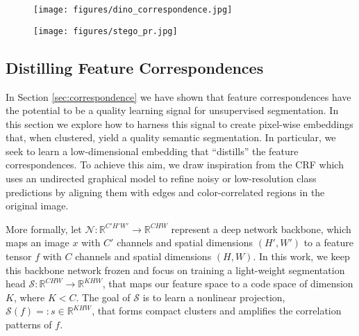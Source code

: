 \documentclass{article} \usepackage{iclr2022_conference,times}
\begin{document}
\begin{figure}[t]
\centering
\begin{minipage}{.60\textwidth}
  \centering
    \texttt{[image: figures/dino\_correspondence.jpg]}
    \vspace{-.2in}
  \label{fig:correspondence}
\end{minipage}\hfill
\begin{minipage}{.38\textwidth}
  \centering
  \texttt{[image: figures/stego\_pr.jpg]}
  \vspace{-.1in}
  \label{fig:pr}
\end{minipage}
\end{figure} 

\subsection{Distilling Feature Correspondences}
\label{sec:distillation} 

In Section \ref{sec:correspondence} we have shown that feature correspondences have the potential to be a quality learning signal for unsupervised segmentation. In this section we explore how to harness this signal to create pixel-wise embeddings that, when clustered, yield a quality semantic segmentation. In particular, we seek to learn a low-dimensional embedding that ``distills'' the feature correspondences. To achieve this aim, we draw inspiration from the CRF which uses an undirected graphical model to refine noisy or low-resolution class predictions by aligning them with edges and color-correlated regions in the original image. 

More formally, let $\mathcal{N}: \mathbb{R}^{C'H'W'} \to \mathbb{R}^{CHW}$ represent a deep network backbone, which maps an image $x$ with $C'$ channels and spatial dimensions $(H',W')$ to a feature tensor $f$ with $C$ channels and spatial dimensions $(H,W)$. In this work, we keep this backbone network frozen and focus on training a light-weight segmentation head $\mathcal{S}: \mathbb{R}^{CHW} \to \mathbb{R}^{KHW}$, that maps our feature space to a code space of dimension $K$, where $K<C$. The goal of $\mathcal{S}$ is to learn a nonlinear projection, $\mathcal{S}(f) =: s  \in \mathbb{R}^{KHW}$, that forms compact clusters and amplifies the correlation patterns of $f$.
\end{document}
